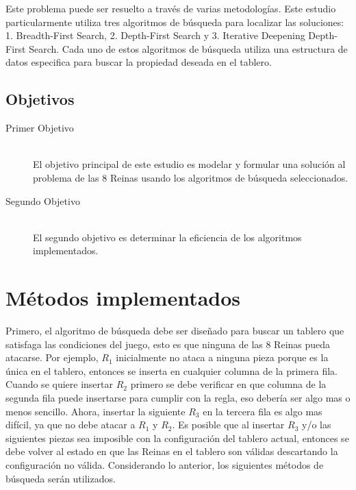 \documentclass[letter, 10pt]{article}
\begin{document}
Este problema puede ser resuelto a través de varias metodologías. Este estudio particularmente utiliza tres algoritmos de búsqueda para localizar las soluciones: 1. Breadth-First Search, 2. Depth-First Search y 3. Iterative Deepening Depth-First Search. Cada uno de estos algoritmos de búsqueda utiliza una estructura de datos especifica para buscar la propiedad deseada en el tablero.

\subsection{Objetivos}

\begin{description}
    \item[Primer Objetivo] \hfill \\
    El objetivo principal de este estudio es modelar y formular una solución al problema de las 8 Reinas usando los algoritmos de búsqueda seleccionados.
    \item[Segundo Objetivo] \hfill \\
    El segundo objetivo es determinar la eficiencia de los algoritmos implementados.
\end{description}



\section{Métodos implementados}

Primero, el algoritmo de búsqueda debe ser diseñado para buscar un tablero que satisfaga las condiciones del juego, esto es que ninguna de las 8 Reinas pueda atacarse. Por ejemplo, $R_{1}$ inicialmente no ataca a ninguna pieza porque es la única en el tablero, entonces se inserta en cualquier columna de la primera fila. Cuando se quiere insertar $R_{2}$ primero se debe verificar en que columna de la segunda fila puede insertarse para cumplir con la regla, eso debería ser algo mas o menos sencillo. Ahora, insertar la siguiente $R_{3}$ en la tercera fila es algo mas difícil, ya que no debe atacar a $R_{1}$ y $R_{2}$. Es posible que al insertar $R_{3}$ y/o las siguientes piezas sea imposible con la configuración del tablero actual, entonces se debe volver al estado en que las Reinas en el tablero son válidas descartando la configuración no válida. Considerando lo anterior, los siguientes métodos de búsqueda serán utilizados.
\end{document}
